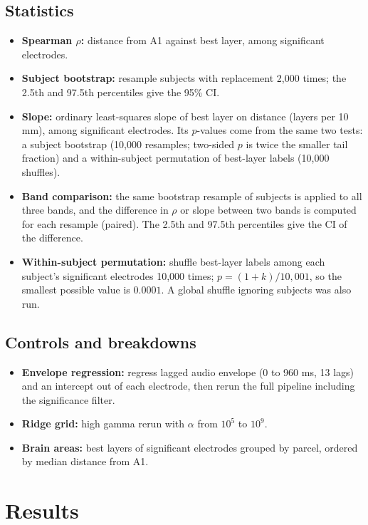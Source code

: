 \documentclass[11pt]{article}
\begin{document}
\subsection{Statistics}
\begin{itemize}
  \item \textbf{Spearman $\rho$:} distance from A1 against best layer, among significant electrodes.
  \item \textbf{Subject bootstrap:} resample subjects with replacement 2,000 times; the 2.5th and 97.5th percentiles give the 95\% CI.
  \item \textbf{Slope:} ordinary least-squares slope of best layer on distance (layers per 10 mm), among significant electrodes. Its $p$-values come from the same two tests: a subject bootstrap (10,000 resamples; two-sided $p$ is twice the smaller tail fraction) and a within-subject permutation of best-layer labels (10,000 shuffles).
  \item \textbf{Band comparison:} the same bootstrap resample of subjects is applied to all three bands, and the difference in $\rho$ or slope between two bands is computed for each resample (paired). The 2.5th and 97.5th percentiles give the CI of the difference.
  \item \textbf{Within-subject permutation:} shuffle best-layer labels among each subject's significant electrodes 10,000 times; $p = (1 + k)/10{,}001$, so the smallest possible value is $0.0001$. A global shuffle ignoring subjects was also run.
\end{itemize}

\subsection{Controls and breakdowns}
\begin{itemize}
  \item \textbf{Envelope regression:} regress lagged audio envelope (0 to 960 ms, 13 lags) and an intercept out of each electrode, then rerun the full pipeline including the significance filter.
  \item \textbf{Ridge grid:} high gamma rerun with $\alpha$ from $10^5$ to $10^9$.
  \item \textbf{Brain areas:} best layers of significant electrodes grouped by parcel, ordered by median distance from A1.
\end{itemize}

\section{Results}
\end{document}
